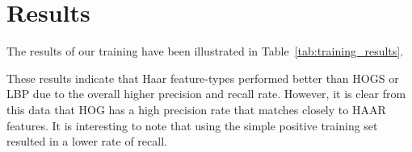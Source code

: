 \documentclass{llncs}
\begin{document}
	\section{Results} {
	\label{sec:results}





		The results of our training have been illustrated in Table~\ref{tab:training_results}.


		These results indicate that Haar feature-types performed better than HOGS or LBP due to the overall higher precision and recall rate. However, it is clear from this data that HOG has a high precision rate that matches closely to HAAR features. It is interesting to note that using the simple positive training set resulted in a lower rate of recall.



}
\end{document}
